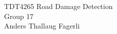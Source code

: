 \documentclass[a4paper]{article}
\begin{document}
\begin{center}
\Large TDT4265 Road Damage Detection \\
\vspace{10pt}
\large Group 17 \\ Anders Thallaug Fagerli
\end{center}



 


\end{document}
